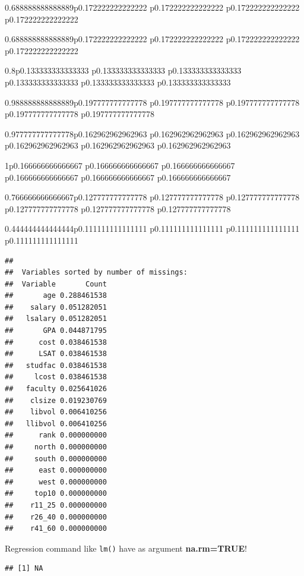 \documentclass[]{book}
\newenvironment{Shaded}{\begin{snugshade}}{\end{snugshade}}
\newcommand{\CommentTok}[1]{\textcolor[rgb]{0.56,0.35,0.01}{\textit{#1}}}
\newcommand{\KeywordTok}[1]{\textcolor[rgb]{0.13,0.29,0.53}{\textbf{#1}}}
\newcommand{\NormalTok}[1]{#1}
\newcommand{\OperatorTok}[1]{\textcolor[rgb]{0.81,0.36,0.00}{\textbf{#1}}}
\begin{document}
\begin{tabularx}{0.688888888888889\textwidth}{p{} p{} p{} p{}}
\begin{tabularx}{0.688888888888889\textwidth}{p{} p{} p{} p{}}
\begin{tabularx}{0.8\textwidth}{p{} p{} p{} p{} p{} p{}}
\begin{tabularx}{0.988888888888889\textwidth}{p{} p{} p{} p{} p{}}
\begin{tabularx}{0.977777777777778\textwidth}{p{} p{} p{} p{} p{} p{}}
\begin{tabularx}{1\textwidth}{p{} p{} p{} p{} p{} p{}}
\begin{tabularx}{0.766666666666667\textwidth}{p{} p{} p{} p{} p{} p{}}
\begin{tabularx}{0.444444444444444\textwidth}{p{} p{} p{} p{}}
\begin{verbatim}
## 
##  Variables sorted by number of missings: 
##  Variable       Count
##       age 0.288461538
##    salary 0.051282051
##   lsalary 0.051282051
##       GPA 0.044871795
##      cost 0.038461538
##      LSAT 0.038461538
##   studfac 0.038461538
##     lcost 0.038461538
##   faculty 0.025641026
##    clsize 0.019230769
##    libvol 0.006410256
##   llibvol 0.006410256
##      rank 0.000000000
##     north 0.000000000
##     south 0.000000000
##      east 0.000000000
##      west 0.000000000
##     top10 0.000000000
##    r11_25 0.000000000
##    r26_40 0.000000000
##    r41_60 0.000000000
\end{verbatim}

Regression command like \texttt{lm()} have as argument
\textbf{na.rm=TRUE}!

\begin{Shaded}
\end{Shaded}

\begin{verbatim}
## [1] NA
\end{verbatim}


\end{tabularx}
\end{tabularx}
\end{tabularx}
\end{tabularx}
\end{tabularx}
\end{tabularx}
\end{tabularx}
\end{tabularx}
\end{document}
